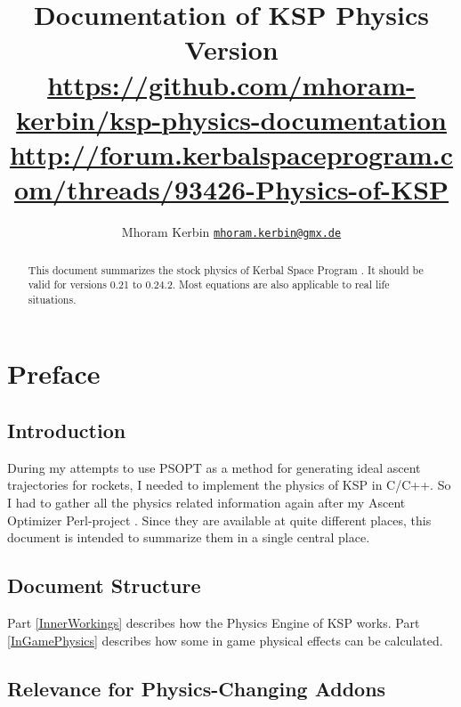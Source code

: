 \documentclass[11pt]{report}
\begin{document}
\title{Documentation of KSP Physics\\\small{Version }\\\vspace{1 em}\url{https://github.com/mhoram-kerbin/ksp-physics-documentation}\\\url{http://forum.kerbalspaceprogram.com/threads/93426-Physics-of-KSP}}
\author {Mhoram Kerbin \href{mailto:mhoram.kerbin@gmx.de}{\nolinkurl{mhoram.kerbin@gmx.de}}}

\maketitle

\begin{abstract}

  This document summarizes the stock physics of Kerbal Space Program
  \cite{KSP}. It should be valid for versions 0.21 to 0.24.2. Most
  equations are also applicable to real life situations.

\end{abstract}

\tableofcontents

\chapter{Preface}

\section{Introduction}

During my attempts to use PSOPT as a method for generating ideal
ascent trajectories for rockets, I needed to implement the physics of
KSP in C/C++. So I had to gather all the physics related information
again after my Ascent Optimizer Perl-project \cite{PAO}. Since they
are available at quite different places, this document is intended to
summarize them in a single central place.

\section{Document Structure}

Part \ref{InnerWorkings} describes how the Physics Engine of KSP
works. Part \ref{InGamePhysics} describes how some in game physical
effects can be calculated.

\section{Relevance for Physics-Changing Addons}
\end{document}
